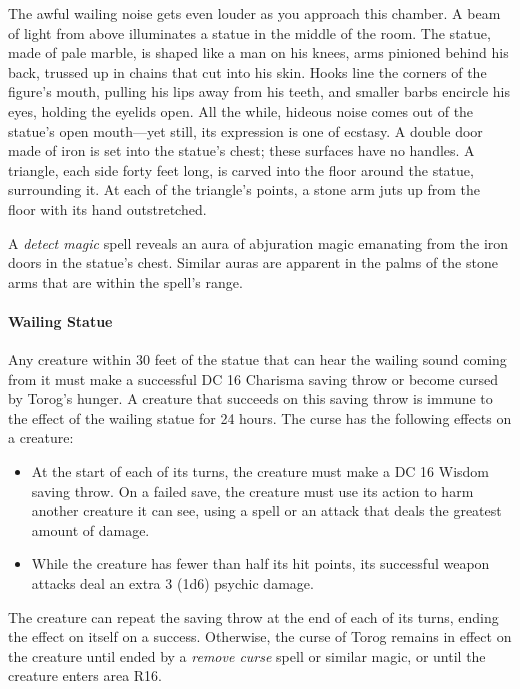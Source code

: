 \documentclass[a4paper, 11pt, bg=full, twocolumn, nooutline]{dndbook}
\begin{document}
\begin{DndReadAloud}
The awful wailing noise gets even louder as you approach this chamber. A beam of light from above illuminates a statue in the middle of the room. The statue, made of pale marble, is shaped like a man on his knees, arms pinioned behind his back, trussed up in chains that cut into his skin. Hooks line the corners of the figure's mouth, pulling his lips away from his teeth, and smaller barbs encircle his eyes, holding the eyelids open. All the while, hideous noise comes out of the statue's open mouth---yet still, its expression is one of ecstasy. A double door made of iron is set into the statue's chest; these surfaces have no handles.
A triangle, each side forty feet long, is carved into the floor around the statue, surrounding it. At each of the triangle's points, a stone arm juts up from the floor with its hand outstretched.
\end{DndReadAloud}

A \textit{detect magic} spell reveals an aura of abjuration magic emanating from the iron doors in the statue's chest. Similar auras are apparent in the palms of the stone arms that are within the spell's range.

\paragraph{Wailing Statue}

Any creature within 30 feet of the statue that can hear the wailing sound coming from it must make a successful DC 16 Charisma saving throw or become cursed by Torog's hunger. A creature that succeeds on this saving throw is immune to the effect of the wailing statue for 24 hours. The curse has the following effects on a creature:

\begin{itemize}
\item At the start of each of its turns, the creature must make a DC 16 Wisdom saving throw. On a failed save, the creature must use its action to harm another creature it can see, using a spell or an attack that deals the greatest amount of damage.
\item While the creature has fewer than half its hit points, its successful weapon attacks deal an extra 3 (1d6) psychic damage.
\end{itemize}

The creature can repeat the saving throw at the end of each of its turns, ending the effect on itself on a success. Otherwise, the curse of Torog remains in effect on the creature until ended by a \textit{remove curse} spell or similar magic, or until the creature enters area R16.
\end{document}
